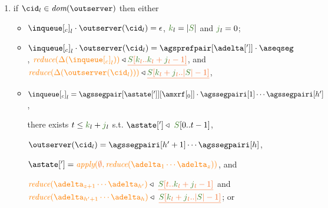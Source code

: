 \begin{definition}
\begin{enumerate}
\item \label{prop_inclient} if $\cid_l \in \dom{\outserver}$ then either
    \begin{itemize}
     \item ${\inclient}_l \cdot \outserver(\cid_l)  = \epsilon$, $\tknown_l = |\queuemessage|$ and $\treceivebuffer_l =0$;

     \item ${\inclient}_l \cdot \outserver(\cid_l)  = \agsprefpair[{\adelta[']}]\cdot\aseqseg$,
      $\ireduce{\igetdeltas{{\inclient}_l}}\triangleleft \flatten{ \queuemessage[\tknown_l..\tknown_l+\treceivebuffer_l-1]}$,  and
      $\ireduce{\igetdeltas{\outserver(\cid_l)}}\triangleleft 
       \flatten{\queuemessage[\tknown_l+\treceivebuffer_l..|\queuemessage| - 1]}$,
  
%      
%	      
%	      
%
%     
%      
%           
     \item ${\inclient}_l = \agssegpair[{\astate[']}][{\amxrf[_0]}]\cdot\agssegpairi[1] \cdots \agssegpairi[h']$, 
     
      there exists $t \leq \tknown_l+\treceivebuffer_l$ s.t. $\astate['] \triangleleft \ \queuemessage[0 .. t - 1]$, 
      
              $\outserver(\cid_l) = \agssegpairi[h'+1] \cdots \agssegpairi[h]$,
              
     		$\astate['] = \iapply{\initialstate}{\ireduce{\adelta_1\cdots\adelta_{z}}}$,
                and 

     
     $\ireduce{\adelta_{z+1}\cdots\adelta_{h'}}\triangleleft \ \flatten{ \queuemessage[t..\tknown_l+\treceivebuffer_l-1]}$ and 
     $\ireduce{\adelta_{h'+1}\cdots\adelta_h}\triangleleft \
       \flatten{\queuemessage[\tknown_l+\treceivebuffer_l..|\queuemessage| - 1]}$; or
     

\end{itemize}
\end{enumerate}
\end{definition}
